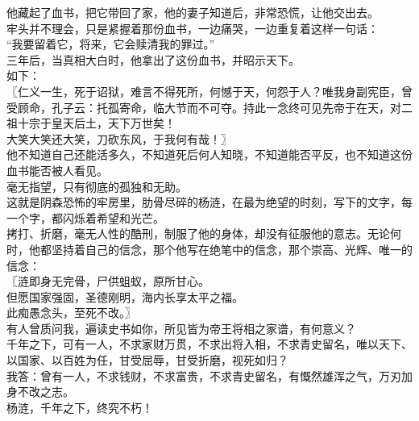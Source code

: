 \begin{multicols}{\theparacolNo}
他藏起了血书，把它带回了家，他的妻子知道后，非常恐慌，让他交出去。\\

牢头并不理会，只是紧握着那份血书，一边痛哭，一边重复着这样一句话：\\

“我要留着它，将来，它会赎清我的罪过。”\\

三年后，当真相大白时，他拿出了这份血书，并昭示天下。\\

如下：\\

〖仁义一生，死于诏狱，难言不得死所，何憾于天，何怨于人？唯我身副宪臣，曾受顾命，孔子云：托孤寄命，临大节而不可夺。持此一念终可见先帝于在天，对二祖十宗于皇天后土，天下万世矣！\\

大笑大笑还大笑，刀砍东风，于我何有哉！〗\\

他不知道自己还能活多久，不知道死后何人知晓，不知道能否平反，也不知道这份血书能否被人看见。\\

毫无指望，只有彻底的孤独和无助。\\

这就是阴森恐怖的牢房里，肋骨尽碎的杨涟，在最为绝望的时刻，写下的文字，每一个字，都闪烁着希望和光芒。\\

拷打、折磨，毫无人性的酷刑，制服了他的身体，却没有征服他的意志。无论何时，他都坚持着自己的信念，那个他写在绝笔中的信念，那个崇高、光辉、唯一的信念：\\

〖涟即身无完骨，尸供蛆蚁，原所甘心。\\

但愿国家强固，圣德刚明，海内长享太平之福。\\

此痴愚念头，至死不改。〗\\

有人曾质问我，遍读史书如你，所见皆为帝王将相之家谱，有何意义？\\

千年之下，可有一人，不求家财万贯，不求出将入相，不求青史留名，唯以天下、以国家、以百姓为任，甘受屈辱，甘受折磨，视死如归？\\

我答：曾有一人，不求钱财，不求富贵，不求青史留名，有慨然雄浑之气，万刃加身不改之志。\\

杨涟，千年之下，终究不朽！\\

\ifnum{}
	\end{multicols}
\fi
\newpage
